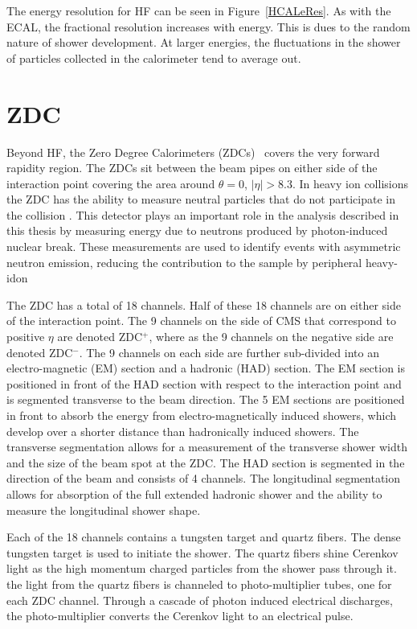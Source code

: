     The energy resolution for HF can be seen in Figure~\ref{HCALeRes}.  
    As with the ECAL, the fractional resolution increases with energy. 
    This is dues to the random nature of shower development. 
    At larger energies, the fluctuations in the shower of particles collected 
      in the calorimeter tend to average out.
    
  \section{ZDC \label{sec:zdcDet}} 
    Beyond HF, the Zero Degree Calorimeters (ZDCs)~\cite{Grachov:2006ke} covers the very forward 
      rapidity region.
    The ZDCs sit between the beam pipes on either side of the interaction point 
      covering the area around $\theta = 0$, $|\eta| > 8.3$.
    In heavy ion collisions the ZDC has the ability to measure neutral particles 
    	that do not participate in the collision \cite{tCmsE}.
    This detector plays an important role in the analysis described in this
      thesis by measuring energy due to neutrons produced by photon-induced 
      nuclear break.
    These measurements are used to identify events with asymmetric neutron 
      emission, reducing the contribution to the sample by peripheral heavy-idon

    The ZDC has a total of 18 channels.
        Half of these 18 channels are on either side of the interaction point.
    The 9 channels on the side of CMS that correspond to positive $\eta$
      are denoted ZDC$^{+}$, where as the 9 channels on the negative side are
      denoted ZDC$^{-}$.
    The 9 channels on each side are further sub-divided into an electro-magnetic  
      (EM) section and a hadronic (HAD) section.
    The EM section is positioned in front of the HAD section with respect to the 
      interaction point and is segmented transverse to the beam direction.
    The 5 EM sections are positioned in front to absorb the energy from 
      electro-magnetically induced showers, which develop over a shorter distance 
      than hadronically induced showers.
    The transverse segmentation allows for a measurement of the transverse shower
      width and the size of the beam spot at the ZDC.
    The HAD section is segmented in the direction of the beam and consists of 4
      channels.
    The longitudinal segmentation allows for absorption of the full extended 
      hadronic shower and the ability to measure the longitudinal shower shape.
    
    Each of the 18 channels contains a tungsten target and quartz fibers.
    The dense tungsten target is used to initiate the shower.
    The quartz fibers shine Cerenkov light as the high momentum charged particles
      from the shower pass through it. 
    the light from the quartz fibers is channeled to photo-multiplier tubes, one 
      for each ZDC channel. 
    Through a cascade of photon induced electrical discharges, the photo-multiplier
      converts the Cerenkov light to an electrical pulse. 
    
